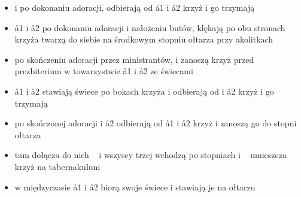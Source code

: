 \begin{itemize}
    \item {} i  po dokonaniu adoracji, odbierają od \aa1 i \aa2 krzyż i go
          trzymają
    \item \aa1 i \aa2 po dokonaniu adoracji i nałożeniu butów, klękają po obu
          stronach krzyża twarzą do siebie na środkowym stopniu ołtarza przy
          akolitkach
    \item po skończeniu adoracji przez ministrantów,  i  zanoszą krzyż
          przed prezbiterium w towarzystwie \aa1 i \aa2 ze świecami
    \item \aa1 i \aa2 stawiają świece po bokach krzyża i odbierają od  i
          \aa2 krzyż i go trzymają
    \item po skończonej adoracji  i \aa2 odbierają od \aa1 i \aa2 krzyż i
          zanoszą go do stopni ołtarza
    \item tam dołącza do nich \ii~ i wszyscy trzej wchodzą po stopniach i \ii~
          umieszcza krzyż na tabernakulum
    \item w międzyczasie \aa1 i \aa2 biorą swoje świece i stawiają je na ołtarzu
\end{itemize}

